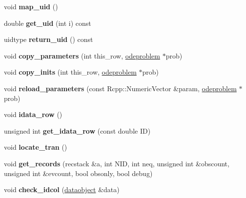 \begin{DoxyCompactItemize}
void {\bfseries map\+\_\+uid} ()
\item 
\mbox{\label{classdataobject_ac4ca33465e8553b7d0cb1f62ff2c8240}} 
double {\bfseries get\+\_\+uid} (int i) const
\item 
\mbox{\label{classdataobject_a91b02c6fe5f13fc48ad4e030152d5b5d}} 
uidtype {\bfseries return\+\_\+uid} () const
\item 
\mbox{\label{classdataobject_a50ca76ba2c3d3726d61226aa1b73c5b6}} 
void {\bfseries copy\+\_\+parameters} (int this\+\_\+row, \hyperlink{classodeproblem}{odeproblem} $\ast$prob)
\item 
\mbox{\label{classdataobject_a325a1e4bd95b50d07642940ec849c999}} 
void {\bfseries copy\+\_\+inits} (int this\+\_\+row, \hyperlink{classodeproblem}{odeproblem} $\ast$prob)
\item 
\mbox{\label{classdataobject_a675c4b37a93b2680528eb7d862f6ffd5}} 
void {\bfseries reload\+\_\+parameters} (const Rcpp\+::\+Numeric\+Vector \&param, \hyperlink{classodeproblem}{odeproblem} $\ast$prob)
\item 
\mbox{\label{classdataobject_a1c4babcbc61c88f2f72500e594adcce6}} 
void {\bfseries idata\+\_\+row} ()
\item 
\mbox{\label{classdataobject_aa91370d528f90c10c9638ba8006e66fb}} 
unsigned int {\bfseries get\+\_\+idata\+\_\+row} (const double ID)
\item 
\mbox{\label{classdataobject_a3e915eb5ff296483a6ae9dbbe394646b}} 
void {\bfseries locate\+\_\+tran} ()
\item 
\mbox{\label{classdataobject_a75e142ee684513e5aac42241c3aed1e6}} 
void {\bfseries get\+\_\+records} (recstack \&a, int N\+ID, int neq, unsigned int \&obscount, unsigned int \&evcount, bool obsonly, bool debug)
\item 
\mbox{\label{classdataobject_a1fde89995a8bbaaf70964bd0dcc90bdd}} 
void {\bfseries check\+\_\+idcol} (\hyperlink{classdataobject}{dataobject} \&data)
\item 

\end{DoxyCompactItemize}
